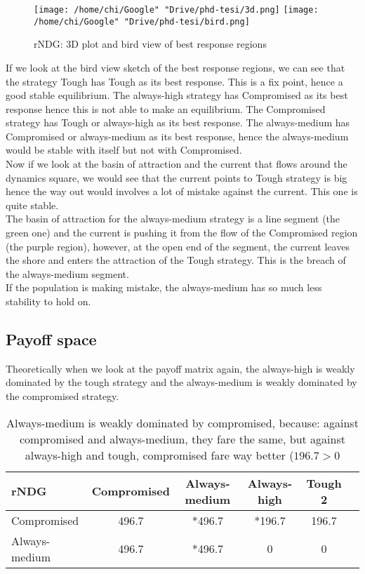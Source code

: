\documentclass[12.5pt]{report}
\begin{document}
\begin{figure}[h!]
\texttt{[image: /home/chi/Google" "Drive/phd-tesi/3d.png]}
\texttt{[image: /home/chi/Google" "Drive/phd-tesi/bird.png]}
\caption{rNDG: 3D plot and bird view of best response regions}
\end{figure}

If we look at the bird view sketch of the best response regions, we can see that the strategy Tough has Tough as its best response. This is a fix point, hence a good stable equilibrium. The always-high strategy has Compromised as its best response hence this is not able to make an equilibrium. The Compromised strategy has Tough or always-high as its best response. The always-medium has Compromised or always-medium as its best response, hence the always-medium would be stable with itself but not with Compromised.\\

Now if we look at the basin of attraction and the current that flows around the dynamics square, we would see that the current points to Tough strategy is big hence the way out would involves a lot of mistake against the current. This one is quite stable.\\

The basin of attraction for the always-medium strategy is a line segment (the green one) and the current is pushing it from the flow of the Compromised region (the purple region), however, at the open end of the segment, the current leaves the shore and enters the attraction of the Tough strategy. This is the breach of the always-medium segment.\\

If the population is making mistake, the always-medium has so much less stability to hold on.

\subsection{Payoff space}
Theoretically when we look at the payoff matrix again, the always-high is weakly dominated by the tough strategy and the always-medium is weakly dominated by the compromised strategy.
\begin{table}
\center
\begin{tabular}{l|ccccc}
\textbf{rNDG}&Compromised& Always-medium & Always-high & Tough 2\\
\hline
Compromised & 496.7 &  *496.7 &  *196.7 &  196.7  \\
Always-medium &  496.7 & *496.7 &     0     &        0    \\

\end{tabular}
\caption{Always-medium is weakly dominated by compromised, because: against compromised and always-medium, they fare the same, but against always-high and tough, compromised fare way better ($196.7 > 0$}
\end{table}
\end{document}
